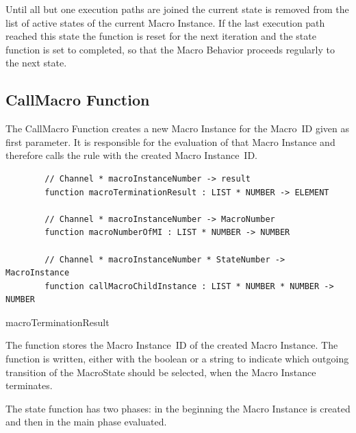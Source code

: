 Until all but one execution paths are joined the current state is removed
from the list of active states of the current Macro Instance. If the last
execution path reached this state the  function is reset for the next
iteration and the state function is set to completed, so that the Macro Behavior proceeds
regularly to the next state.





\subsection{CallMacro Function}


The CallMacro Function creates a new Macro Instance for the Macro~ID given as
first parameter. It is responsible for the evaluation of that Macro Instance
and therefore calls the  rule with the created Macro
Instance~ID.


\begin{listing}[H]
	\begin{verbatim}
		// Channel * macroInstanceNumber -> result
		function macroTerminationResult : LIST * NUMBER -> ELEMENT
		
		// Channel * macroInstanceNumber -> MacroNumber
		function macroNumberOfMI : LIST * NUMBER -> NUMBER
		
		// Channel * macroInstanceNumber * StateNumber -> MacroInstance
		function callMacroChildInstance : LIST * NUMBER * NUMBER -> NUMBER
	\end{verbatim}
	\caption{macroTerminationResult}
	\label{lst:shortasm:macroTerminationResult}
\end{listing}



The  function stores the Macro Instance~ID
of the created Macro Instance. The 
function is written, either with the boolean  or a string to
indicate which outgoing transition of the MacroState should be selected, when the
Macro Instance terminates.

The state function has two phases: in the beginning the Macro Instance is created
and then in the main phase evaluated.



